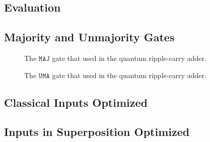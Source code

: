 \begin{appendices}
\chapter{Evaluation}
\section{Majority and Unmajority Gates}
\label{appendix:majGates}
\begin{figure}[htp]
    \centering     
    \begin{minipage}{.45\textwidth}
        
        \caption{The $\texttt{MAJ}$ gate that used in the quantum ripple-carry adder.}
        \label{fig:eval_majorityGate}
    \end{minipage}
    \hfill
    \begin{minipage}{.45\textwidth}
        
        \caption{The $\texttt{UMA}$ gate that used in the quantum ripple-carry adder.}    
        \label{fig:eval_unmajorityGate}
    \end{minipage}
\end{figure}

\section{Classical Inputs Optimized}
\label{appendix:classicalInputs_optimized}


\newpage
\section{Inputs in Superposition Optimized}
\label{appendix:superposInputs_optimized}






\end{appendices}
